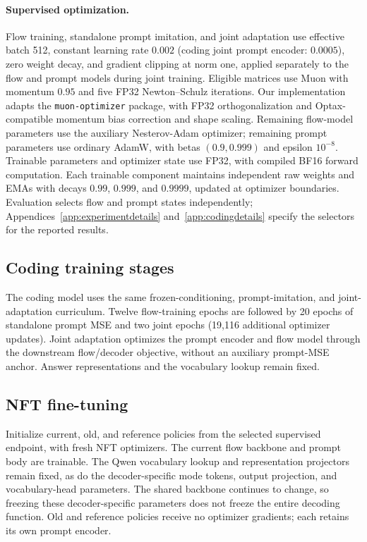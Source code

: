 \documentclass[11pt,letterpaper]{article}
\begin{document}
\paragraph{Supervised optimization.}
Flow training, standalone prompt imitation, and joint adaptation use effective batch 512, constant learning rate $0.002$ (coding joint prompt encoder: $0.0005$), zero weight decay, and gradient clipping at norm one, applied separately to the flow and prompt models during joint training. Eligible matrices use Muon \citep{muon} with momentum $0.95$ and five FP32 Newton--Schulz iterations. Our implementation adapts the \texttt{muon-optimizer} package, with FP32 orthogonalization and Optax-compatible momentum bias correction and shape scaling. Remaining flow-model parameters use the auxiliary Nesterov-Adam optimizer; remaining prompt parameters use ordinary AdamW, with betas $(0.9,0.999)$ and epsilon $10^{-8}$. Trainable parameters and optimizer state use FP32, with compiled BF16 forward computation. Each trainable component maintains independent raw weights and EMAs with decays $0.99$, $0.999$, and $0.9999$, updated at optimizer boundaries. Evaluation selects flow and prompt states independently; Appendices~\ref{app:experimentdetails} and~\ref{app:codingdetails} specify the selectors for the reported results.

\subsection{Coding training stages}
\label{app:codingtraining}

The coding model uses the same frozen-conditioning, prompt-imitation, and joint-adaptation curriculum. Twelve flow-training epochs are followed by 20 epochs of standalone prompt MSE and two joint epochs (19,116 additional optimizer updates). Joint adaptation optimizes the prompt encoder and flow model through the downstream flow/decoder objective, without an auxiliary prompt-MSE anchor. Answer representations and the vocabulary lookup remain fixed.

\subsection{NFT fine-tuning}
\label{app:nfttraining}

Initialize current, old, and reference policies from the selected supervised endpoint, with fresh NFT optimizers. The current flow backbone and prompt body are trainable. The Qwen vocabulary lookup and representation projectors remain fixed, as do the decoder-specific mode tokens, output projection, and vocabulary-head parameters. The shared backbone continues to change, so freezing these decoder-specific parameters does not freeze the entire decoding function. Old and reference policies receive no optimizer gradients; each retains its own prompt encoder.
\end{document}
